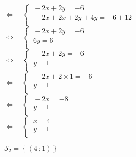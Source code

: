 \documentclass[a4paper,11pt,exos]{nsi} %
\begin{document}
\begin{enumerate}
\begin{tabbing}
                \>  $\iff\quad \left\{
                    \begin{array}{l}
                        \ -2x+2y=-6 \\
                        \ -2x+2x+2y+4y=-6+12 \\
                \end{array} \right.$\\[.5em]

                \>  $\iff\quad \left\{
                    \begin{array}{l}
                        \ -2x+2y=-6 \\
                        \ 6y=6 \\
                \end{array} \right.$\\[.5em]

                \>  $\iff\quad \left\{
                    \begin{array}{l}
                        \ -2x+2y=-6 \\
                        \ y=1 \\
                \end{array} \right.$\\[.5em]

                \>  $\iff\quad \left\{
                    \begin{array}{l}
                        \ -2x+2\times 1=-6 \\
                        \ y=1 \\
                \end{array} \right.$\\[.5em]

                \>  $\iff\quad \left\{
                    \begin{array}{l}
                        \ -2x=-8 \\
                        \ y=1 \\
                \end{array} \right.$\\[.5em]

                \>  $\iff\quad \left\{
                    \begin{array}{l}
                        \ x=4 \\
                        \ y=1 \\
                \end{array} \right.$
        \end{tabbing}
        $\mathcal{S}_2=\left\{\left(4\ ;1\right)\right\}$
    

\end{enumerate}
\end{document}
